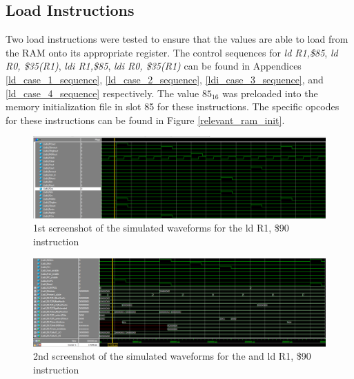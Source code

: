 \documentclass{article}
\begin{document}
    \subsection{Load Instructions}
        Two load instructions were tested to ensure that the values are able to load from the RAM onto its appropriate register. The control sequences for \emph{ld R1,\$85}, \emph{ld R0, \$35(R1)}, \emph{ldi R1,\$85}, \emph{ldi R0, \$35(R1)} can be found in  Appendices \ref{ld_case_1_sequence}, \ref{ld_case_2_sequence}, \ref{ldi_case_3_sequence}, and \ref{ld_case_4_sequence}  respectively. The value $85_{16}$ was preloaded into the memory initialization file in slot 85 for these instructions. The specific opcodes for these instructions can be found in Figure \ref{relevant_ram_init}. 
       
        \begin{figure}[h!]

            \begin{center}
                \includegraphics[width=15cm]{ld_case_1_wave_top_half.png}
                \caption{1st screenshot of the simulated waveforms for the  ld  R1, \$90 instruction}
            \end{center}
        \end{figure}

        \begin{figure}[h!]
            \begin{center}
                \includegraphics[width=15cm]{ld_case_1_wave_bottom_half.png}
                \caption{2nd screenshot of the simulated waveforms for the and ld  R1, \$90 instruction}
            \end{center}
        \end{figure}
\end{document}
